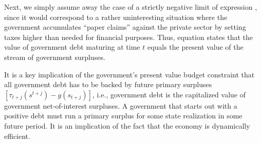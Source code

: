 Next, we simply assume
away the case of a strictly
negative limit of expression , since it would
correspond to a rather uninteresting situation where the government
accumulates ``paper claims'' against the private sector by setting
taxes higher than needed for financial purposes.
Thus, equation   states that the value of
government debt maturing at time $t$ equals the present value of the
stream of government surpluses.

It is a key implication of the government's present value budget constraint
 that all government debt has to be backed by future
primary surpluses $[\tau_{t+j}(s^{t+j})-g(s_{t+j})]$,
i.e., government debt is the capitalized value of government
net-of-interest surpluses. %
A government that starts out with a positive debt must run a
primary surplus for some state realization in some
future period. It is an implication of the fact that the economy is dynamically
efficient.



